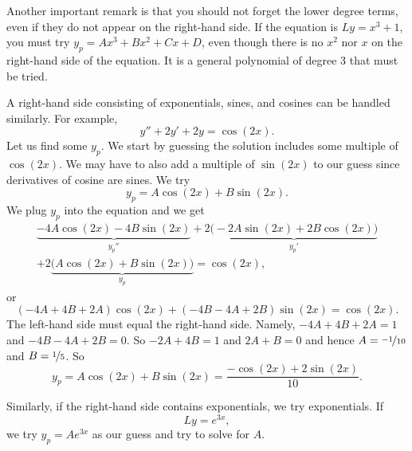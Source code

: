 Another important remark is that you should not forget the lower degree
terms, even if they do not appear on the right-hand side.  If the equation
is $Ly=x^3+1$, you must try $y_p = Ax^3+Bx^2+Cx+D$, even though there is
no $x^2$ nor $x$ on the right-hand side of the equation.  It is
a general polynomial of degree 3 that must be tried.

\medskip

A right-hand side consisting of exponentials, sines, and cosines
can be handled similarly.  For example,
\begin{equation*}
y''+2y'+2y = \cos (2x) .
\end{equation*}
Let us find some $y_p$.  We start by guessing the solution
includes some multiple of $\cos(2x)$.
We may have to also
add a multiple of $\sin (2x)$ to our guess since derivatives of cosine are
sines.  We try
\begin{equation*}
y_p = A \cos (2x) + B \sin (2x) .
\end{equation*}
We plug $y_p$ into the equation and we get
\begin{multline*}
\underbrace{-4 A \cos (2x) - 4 B \sin (2x)}_{y_p''}
+2 \underbrace{\bigl(-2A \sin (2x) + 2B \cos (2x)\bigr)}_{y_p'}
\\
+
2 \underbrace{\bigl(A \cos (2x) + B \sin (2x)\bigr)}_{y_p}
= \cos (2x) ,
\end{multline*}
or
\begin{equation*}
(-4A+4B+2A) \cos(2x) +
(-4B-4A+2B) \sin(2x)
= \cos(2x) .
\end{equation*}
The left-hand side must equal the right-hand side.  Namely,
$-4A + 4B + 2A = 1$ and
$-4B - 4A + 2B = 0$.  So $-2A+4B =1$ and $2A+B=0$ and hence
$A=\nicefrac{-1}{10}$ and $B=\nicefrac{1}{5}$.  So
\begin{equation*}
y_p = A \cos (2x) + B \sin (2x) = \frac{-\cos (2x) + 2 \sin (2x)}{10} .
\end{equation*}

Similarly, if the right-hand side contains exponentials, we try
exponentials.  If
\begin{equation*}
Ly = e^{3x},
\end{equation*}
we try $y_p = A e^{3x}$ as our guess and try to solve for $A$.

\medskip

